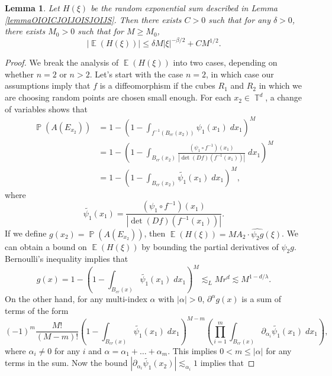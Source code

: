 \documentclass[dvipsnames,letterpaper,12pt]{article}
\numberwithin{equation}{section}
\DeclareMathOperator{\TT}{\mathbb{T}}
\newtheorem{lemma}[theorem]{Lemma}
\numberwithin{theorem}{section}
\DeclareMathOperator{\EE}{\mathbb{E}}
\DeclareMathOperator{\PP}{\mathbb{P}}
\begin{document}
\begin{lemma} \label{lemmaOIJIOCJSOIJSIOJ123}
    Let $H(\xi)$ be the random exponential sum described in Lemma \ref{lemmaOIOICJOIJOISJOIJS}. Then there exists $C > 0$ such that for any $\delta > 0$, there exists $M_0 > 0$ such that for $M \geq M_0$,
    \[ |\EE(H(\xi))| \leq \delta M |\xi|^{-\beta/2} + C M^{1/2}. \]
\end{lemma}
\begin{proof}
    We break the analysis of $\EE(H(\xi))$ into two cases, depending on whether $n = 2$ or $n > 2$. Let's start with the case $n = 2$, in which case our assumptions imply that $f$ is a diffeomorphism if the cubes $R_1$ and $R_2$ in which we are choosing random points are chosen small enough. For each $x_2 \in \TT^d$, a change of variables shows that
    \begin{equation}
    \begin{split}
        \PP(A(E_{x_2})) &= 1 - \left( 1 - \int_{f^{-1}(B_{cr}(x_2))} \psi_1(x_1)\; dx_1 \right)^M\\
        &= 1 - \left( 1 - \int_{B_{cr}(x_2)} \frac{(\psi_1 \circ f^{-1})(x_1)}{|\det(Df)(f^{-1}(x_1))|}\; dx_1 \right)^M\\
        &= 1 - \left( 1 - \int_{B_{cr}(x_2)} \tilde{\psi_1}(x_1)\; dx_1 \right)^M,
    \end{split}
    \end{equation}
    where
    \[ \tilde{\psi_1}(x_1) = \frac{(\psi_1 \circ f^{-1})(x_1)}{|\det(Df)(f^{-1}(x_1))|}. \]
    If we define $g(x_2) = \PP(A(E_{x_2}))$, then  $\EE(H(\xi)) = M A_2 \cdot \widehat{\psi_2 g}(\xi)$. We can obtain a bound on $\EE(H(\xi))$ by bounding the partial derivatives of $\psi_2 g$. Bernoulli's inequality implies that
    \begin{equation}
        g(x) = 1 - \left( 1 - \int_{B_{cr}(x)} \tilde{\psi_1}(x_1)\; dx_1 \right)^M \lesssim_L M r^d \lesssim M^{1 - d/\lambda}.
    \end{equation}
    On the other hand, for any multi-index $\alpha$ with $|\alpha| > 0$, $\partial^\alpha g(x)$ is a sum of terms of the form
    \begin{equation} \label{equationDOIJACOIJCIOJ3123123214312}
        (-1)^m \frac{M!}{(M-m)!} \left( 1 - \int_{B_{cr}(x)} \tilde{\psi_1}(x_1)\; dx_1 \right)^{M-m} \left( \prod_{i = 1}^{m} \int_{B_{cr}(x)} \partial_{\alpha_i} \tilde{\psi_1}(x_1)\; dx_1 \right),
    \end{equation}
    where $\alpha_i \neq 0$ for any $i$ and $\alpha = \alpha_1 + \dots + \alpha_m$. This implies $0 < m \leq |\alpha|$ for any terms in the sum. Now the bound $|\partial_{\alpha_i} \tilde{\psi_1}(x_2)| \lesssim_{\alpha_i} 1$ implies that

\end{proof}
\end{document}
